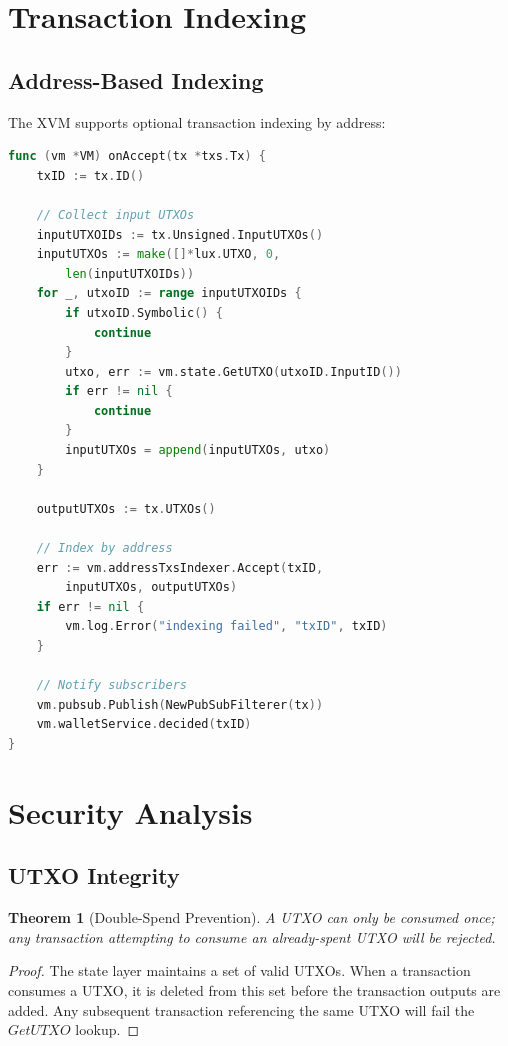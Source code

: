 \documentclass[11pt,a4paper]{article}
\newtheorem{theorem}{Theorem}
\begin{document}
\section{Transaction Indexing}

\subsection{Address-Based Indexing}

The XVM supports optional transaction indexing by address:

\begin{lstlisting}[language=Go,caption={Transaction Indexing}]
func (vm *VM) onAccept(tx *txs.Tx) {
    txID := tx.ID()

    // Collect input UTXOs
    inputUTXOIDs := tx.Unsigned.InputUTXOs()
    inputUTXOs := make([]*lux.UTXO, 0,
        len(inputUTXOIDs))
    for _, utxoID := range inputUTXOIDs {
        if utxoID.Symbolic() {
            continue
        }
        utxo, err := vm.state.GetUTXO(utxoID.InputID())
        if err != nil {
            continue
        }
        inputUTXOs = append(inputUTXOs, utxo)
    }

    outputUTXOs := tx.UTXOs()

    // Index by address
    err := vm.addressTxsIndexer.Accept(txID,
        inputUTXOs, outputUTXOs)
    if err != nil {
        vm.log.Error("indexing failed", "txID", txID)
    }

    // Notify subscribers
    vm.pubsub.Publish(NewPubSubFilterer(tx))
    vm.walletService.decided(txID)
}
\end{lstlisting}

\section{Security Analysis}

\subsection{UTXO Integrity}

\begin{theorem}[Double-Spend Prevention]
A UTXO can only be consumed once; any transaction attempting to consume an already-spent UTXO will be rejected.
\end{theorem}

\begin{proof}
The state layer maintains a set of valid UTXOs. When a transaction consumes a UTXO, it is deleted from this set before the transaction outputs are added. Any subsequent transaction referencing the same UTXO will fail the $GetUTXO$ lookup.
\end{proof}
\end{document}
